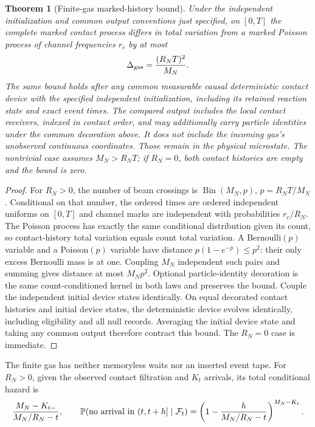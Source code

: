 \documentclass[11pt]{article}
\newtheorem{theorem}{Theorem}[section]
\theoremstyle{definition}\newtheorem{definition}[theorem]{Definition}
\theoremstyle{remark}\newtheorem{remark}[theorem]{Remark}
\begin{document}
\begin{theorem}[Finite-gas marked-history bound]\label{thm:gas}
Under the independent initialization and common output conventions just specified, on $[0,T]$ the complete marked contact process differs in total variation from a marked Poisson process of channel frequencies $r_c$ by at most
\begin{equation}
 \Delta_{\rm gas}=\frac{(R_NT)^2}{M_N}.
 \label{eq:gaserror}
\end{equation}
The same bound holds after any common measurable causal deterministic contact device with the specified independent initialization, including its retained reaction state and exact event times. The compared output includes the local contact receivers, indexed in contact order, and may additionally carry particle identities under the common decoration above. It does not include the incoming gas's unobserved continuous coordinates. Those remain in the physical microstate. The nontrivial case assumes $M_N>R_NT$; if $R_N=0$, both contact histories are empty and the bound is zero.
\end{theorem}
\begin{proof}
For $R_N>0$, the number of beam crossings is $\operatorname{Bin}(M_N,p)$, $p=R_NT/M_N$. Conditional on that number, the ordered times are ordered independent uniforms on $[0,T]$ and channel marks are independent with probabilities $r_c/R_N$. The Poisson process has exactly the same conditional distribution given its count, so contact-history total variation equals count total variation. A Bernoulli$(p)$ variable and a Poisson$(p)$ variable have distance $p(1-e^{-p})\le p^2$: their only excess Bernoulli mass is at one. Coupling $M_N$ independent such pairs and summing gives distance at most $M_Np^2$. Optional particle-identity decoration is the same count-conditioned kernel in both laws and preserves the bound. Couple the independent initial device states identically. On equal decorated contact histories and initial device states, the deterministic device evolves identically, including eligibility and all null records. Averaging the initial device state and taking any common output therefore contract this bound. The $R_N=0$ case is immediate.
\end{proof}
The finite gas has neither memoryless waits nor an inserted event tape. For $R_N>0$, given the observed contact filtration and $K_t$ arrivals, its total conditional hazard is
\[
 \frac{M_N-K_{t-}}{M_N/R_N-t},
 \qquad
 \mathbb P(\text{no arrival in }(t,t+h]\mid\mathcal F_t)
  =\left(1-\frac{h}{M_N/R_N-t}\right)^{M_N-K_t}.
\]
\end{document}
